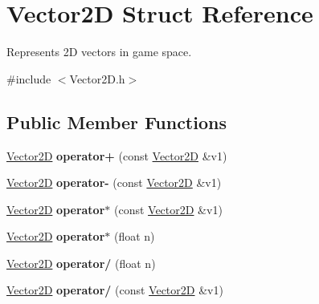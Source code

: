 \hypertarget{struct_vector2_d}{}\section{Vector2D Struct Reference}
\label{struct_vector2_d}


Represents 2D vectors in game space.  




{\ttfamily \#include $<$Vector2\+D.\+h$>$}

\subsection*{Public Member Functions}
\begin{DoxyCompactItemize}
\item 
\mbox{\label{struct_vector2_d_a8efc0645c81ad58c9bd4bc6143343164}} 
\mbox{\hyperlink{struct_vector2_d}{Vector2D}} {\bfseries operator+} (const \mbox{\hyperlink{struct_vector2_d}{Vector2D}} \&v1)
\item 
\mbox{\label{struct_vector2_d_a135c4267d27d7b463de8d402ba5818a5}} 
\mbox{\hyperlink{struct_vector2_d}{Vector2D}} {\bfseries operator-\/} (const \mbox{\hyperlink{struct_vector2_d}{Vector2D}} \&v1)
\item 
\mbox{\label{struct_vector2_d_a8ab57bed4f60dad5d083e8b8e833b61f}} 
\mbox{\hyperlink{struct_vector2_d}{Vector2D}} {\bfseries operator$\ast$} (const \mbox{\hyperlink{struct_vector2_d}{Vector2D}} \&v1)
\item 
\mbox{\label{struct_vector2_d_af7e138a171dfd8dff3cb74a63a8acd56}} 
\mbox{\hyperlink{struct_vector2_d}{Vector2D}} {\bfseries operator$\ast$} (float n)
\item 
\mbox{\label{struct_vector2_d_ad52aa5d47895dc94d423d469bd0a7a87}} 
\mbox{\hyperlink{struct_vector2_d}{Vector2D}} {\bfseries operator/} (float n)
\item 
\mbox{\label{struct_vector2_d_ab726c203370e88dd55a07dc8d1bc55a9}} 
\mbox{\hyperlink{struct_vector2_d}{Vector2D}} {\bfseries operator/} (const \mbox{\hyperlink{struct_vector2_d}{Vector2D}} \&v1)
\item 
\mbox{\label{struct_vector2_d_a4382e9f5d04464d8509e0eba8ac23815}} 

\end{DoxyCompactItemize}
